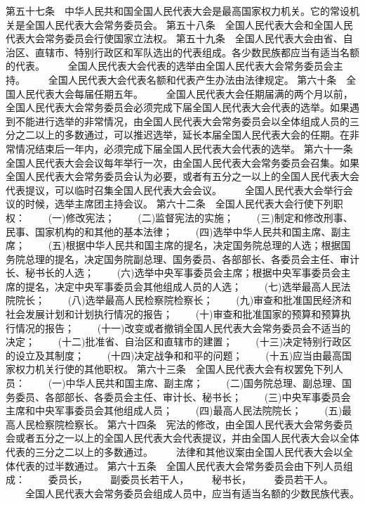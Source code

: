      第五十七条　中华人民共和国全国人民代表大会是最高国家权力机关。它的常设机关是全国人民代表大会常务委员会。
     第五十八条　全国人民代表大会和全国人民代表大会常务委员会行使国家立法权。
     第五十九条　全国人民代表大会由省、自治区、直辖市、特别行政区和军队选出的代表组成。各少数民族都应当有适当名额的代表。
　　全国人民代表大会代表的选举由全国人民代表大会常务委员会主持。
　　全国人民代表大会代表名额和代表产生办法由法律规定。
     第六十条　全国人民代表大会每届任期五年。
 　　全国人民代表大会任期届满的两个月以前，全国人民代表大会常务委员会必须完成下届全国人民代表大会代表的选举。如果遇到不能进行选举的非常情况，由全国人民代表大会常务委员会以全体组成人员的三分之二以上的多数通过，可以推迟选举，延长本届全国人民代表大会的任期。在非常情况结束后一年内，必须完成下届全国人民代表大会代表的选举。
     第六十一条　全国人民代表大会会议每年举行一次，由全国人民代表大会常务委员会召集。如果全国人民代表大会常务委员会认为必要，或者有五分之一以上的全国人民代表大会代表提议，可以临时召集全国人民代表大会会议。
　　全国人民代表大会举行会议的时候，选举主席团主持会议。
     第六十二条　全国人民代表大会行使下列职权：
　　(一)修改宪法；
　　(二)监督宪法的实施；
　　(三)制定和修改刑事、民事、国家机构的和其他的基本法律；
　　(四)选举中华人民共和国主席、副主席；
　　(五)根据中华人民共和国主席的提名，决定国务院总理的人选；根据国务院总理的提名，决定国务院副总理、国务委员、各部部长、各委员会主任、审计长、秘书长的人选；
　　(六)选举中央军事委员会主席；根据中央军事委员会主席的提名，决定中央军事委员会其他组成人员的人选；
　　(七)选举最高人民法院院长；
　　(八)选举最高人民检察院检察长；
　　(九)审查和批准国民经济和社会发展计划和计划执行情况的报告；
　　(十)审查和批准国家的预算和预算执行情况的报告；
　　(十一)改变或者撤销全国人民代表大会常务委员会不适当的决定；
　　(十二)批准省、自治区和直辖市的建置；
　　(十三)决定特别行政区的设立及其制度；
　　(十四)决定战争和和平的问题；
　　(十五)应当由最高国家权力机关行使的其他职权。
     第六十三条　全国人民代表大会有权罢免下列人员：
　　(一)中华人民共和国主席、副主席；
　　(二)国务院总理、副总理、国务委员、各部部长、各委员会主任、审计长、秘书长；
　　(三)中央军事委员会主席和中央军事委员会其他组成人员；
　　(四)最高人民法院院长；
　　(五)最高人民检察院检察长。
     第六十四条　宪法的修改，由全国人民代表大会常务委员会或者五分之一以上的全国人民代表大会代表提议，并由全国人民代表大会以全体代表的三分之二以上的多数通过。
　　法律和其他议案由全国人民代表大会以全体代表的过半数通过。
     第六十五条　全国人民代表大会常务委员会由下列人员组成：
　　委员长，
　　副委员长若干人，
　　秘书长，
　　委员若干人。
　　全国人民代表大会常务委员会组成人员中，应当有适当名额的少数民族代表。
